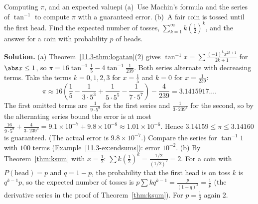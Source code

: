 \documentclass[11pt]{article}
\begin{document}
\begin{exmp}{Computing $\pi$, and an expected value}{pi}
(a)~Use Machin's formula and the series of $\tan^{-1}$ to compute $\pi$ with a guaranteed error. (b)~A fair coin is tossed until the first head. Find the expected number of tosses, $\sum_{k=1}^\infty k\left(\frac12\right)^k$, and the answer for a coin with probability $p$ of heads.

\textbf{Solution.} (a) Theorem~\ref{11.3-thm:logatan}(2) gives $\tan^{-1}x=\sum\frac{(-1)^kx^{2k+1}}{2k+1}$ for $\abs x\le1$, so $\pi=16\tan^{-1}\frac15-4\tan^{-1}\frac1{239}$. Both series alternate with decreasing terms. Take the terms $k=0,1,2,3$ for $x=\frac15$ and $k=0$ for $x=\frac1{239}$:
\[
\pi\approx16\left(\frac15-\frac1{3\cdot5^3}+\frac1{5\cdot5^5}-\frac1{7\cdot5^7}\right)-\frac4{239}=3.1415917\ldots .
\]
The first omitted terms are $\frac1{9\cdot5^9}$ for the first series and $\frac1{3\cdot239^3}$ for the second, so by the alternating series bound the error is at most $\frac{16}{9\cdot5^9}+\frac4{3\cdot239^3}=9.1\times10^{-7}+9.8\times10^{-8}\approx1.01\times10^{-6}$. Hence $3.14159\le\pi\le3.14160$ is guaranteed. (The actual error is $9.8\times10^{-7}$.) Compare the series for $\tan^{-1}1$ with $100$ terms (Example~\ref{11.3-ex:endsums}): error $10^{-2}$.
(b) By Theorem~\ref{thm:ksum} with $x=\frac12$: $\sum k\left(\frac12\right)^k=\frac{1/2}{(1/2)^2}=2$. For a coin with $P(\text{head})=p$ and $q=1-p$, the probability that the first head is on toss $k$ is $q^{k-1}p$, so the expected number of tosses is $p\sum kq^{k-1}=\frac p{(1-q)^2}=\frac1p$ (the derivative series in the proof of Theorem~\ref{thm:ksum}). For $p=\frac12$ again $2$.
\end{exmp}
\end{document}
